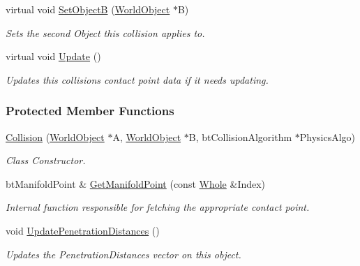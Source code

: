 \begin{DoxyCompactItemize}
virtual void \hyperlink{classMezzanine_1_1Collision_a4254bbe27f1d7362d79cecd46d6d2b24}{SetObjectB} (\hyperlink{classMezzanine_1_1WorldObject}{WorldObject} $\ast$B)
\begin{DoxyCompactList}\small\item\em Sets the second Object this collision applies to. \item\end{DoxyCompactList}\item 
\hypertarget{classMezzanine_1_1Collision_afee98e7728b4f2a4865a2ef38a051577}{
virtual void \hyperlink{classMezzanine_1_1Collision_afee98e7728b4f2a4865a2ef38a051577}{Update} ()}
\label{classMezzanine_1_1Collision_afee98e7728b4f2a4865a2ef38a051577}

\begin{DoxyCompactList}\small\item\em Updates this collisions contact point data if it needs updating. \item\end{DoxyCompactList}\end{DoxyCompactItemize}
\subsubsection*{Protected Member Functions}
\begin{DoxyCompactItemize}
\item 
\hyperlink{classMezzanine_1_1Collision_a2f367a05c29086e86395ca5f6f2c4728}{Collision} (\hyperlink{classMezzanine_1_1WorldObject}{WorldObject} $\ast$A, \hyperlink{classMezzanine_1_1WorldObject}{WorldObject} $\ast$B, btCollisionAlgorithm $\ast$PhysicsAlgo)
\begin{DoxyCompactList}\small\item\em Class Constructor. \item\end{DoxyCompactList}\item 
\hypertarget{classMezzanine_1_1Collision_ab337bbfb55f330ac095934cd1a0e40ed}{
btManifoldPoint \& \hyperlink{classMezzanine_1_1Collision_ab337bbfb55f330ac095934cd1a0e40ed}{GetManifoldPoint} (const \hyperlink{namespaceMezzanine_adcbb6ce6d1eb4379d109e51171e2e493}{Whole} \&Index)}
\label{classMezzanine_1_1Collision_ab337bbfb55f330ac095934cd1a0e40ed}

\begin{DoxyCompactList}\small\item\em Internal function responsible for fetching the appropriate contact point. \item\end{DoxyCompactList}\item 
\hypertarget{classMezzanine_1_1Collision_ac64ad25958ee82b8fdfd61888f2531f9}{
void \hyperlink{classMezzanine_1_1Collision_ac64ad25958ee82b8fdfd61888f2531f9}{UpdatePenetrationDistances} ()}
\label{classMezzanine_1_1Collision_ac64ad25958ee82b8fdfd61888f2531f9}

\begin{DoxyCompactList}\small\item\em Updates the PenetrationDistances vector on this object. \item\end{DoxyCompactList}\end{DoxyCompactItemize}
